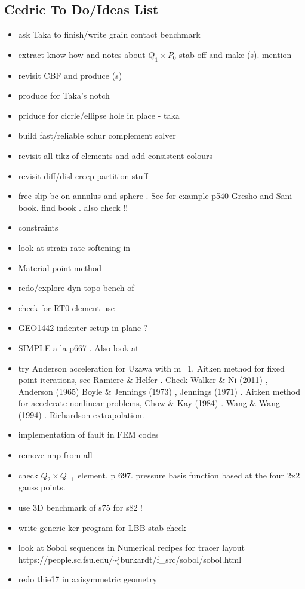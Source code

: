 \subsection{Cedric To Do/Ideas List}

\begin{itemize}
\item ask Taka to finish/write grain contact benchmark
\item extract know-how and notes about $Q_1 \times P_0$-stab off \elefant and 
make \stone(s). mention \cite{lisi12}
\item revisit CBF and produce \stone(s)
\item produce \stone for Taka's notch
\item priduce \stone for cicrle/ellipse hole in place - taka
\item build fast/reliable schur complement solver
\item revisit all tikz of elements and add consistent colours
\item revisit diff/disl creep partition stuff
\item free-slip bc on annulus and sphere . See for example p540 Gresho and Sani book. find book \cite{deab72}.
also check \cite{ensg82} !!
\item constraints \cite{absh79}
\item look at strain-rate softening in \cite{belz02}
\item Material point method \cite{sucs94,susc96,susp07}
\item redo/explore dyn topo bench of \cite{bore19}
\item check \cite{bufm19} for RT0 element use
\item GEO1442 indenter setup in plane ?
\item SIMPLE a la p667 \cite{john16}. Also look at \cite{vusb00} 
\item try Anderson acceleration for Uzawa \cite{hoow17} with m=1. Aitken method for 
fixed point iterations, see Ramiere \& Helfer \cite{rahe15}.
Check Walker \& Ni (2011) \cite{wani11}, Anderson (1965) \cite{ande65}
Boyle \& Jennings (1973) \cite{boje73}, Jennings (1971) \cite{jenn71}.
Aitken method for accelerate nonlinear problems, Chow \& Kay (1984) \cite{chka84}.
Wang \& Wang (1994) \cite{wawa94}. Richardson extrapolation. 
\item implementation of fault in FEM codes \cite{zhgu94,zhgu95}
\item remove nnp from all \stones
\item check $Q_2 \times Q_{-1}$ element, \cite{grsa} p 697. pressure basis function based at the four 2x2 gauss points.
\item use 3D benchmark of s75 for s82 !
\item write generic ker program for LBB stab check
\item look at Sobol sequences in Numerical recipes for tracer layout\\
https://people.sc.fsu.edu/\~{}jburkardt/f\_src/sobol/sobol.html
\item redo thie17 in axisymmetric geometry



\end{itemize}
